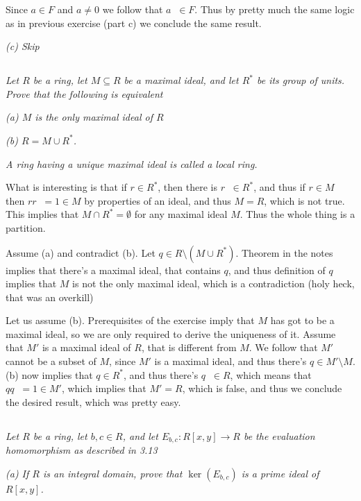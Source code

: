 \documentclass[11pt,oneside,titlepage]{book}
\DeclareMathOperator \inv {^{-1}}
\begin{document}
Since $a \in F$ and $a \neq 0$ we follow that $a \inv \in F$. Thus by
pretty much the same logic as in previous exercise (part c) we
conclude the same result.

\textit{(c) Skip}

\subsection{}

\textit{Let $R$ be a ring, let $M \subseteq R$ be a maximal ideal, and
let $R^*$ be its group of units. Prove that the following is
equivalent}

\textit{(a) $M$ is the only maximal ideal of $R$}

\textit{(b) $R = M \cup R^*$.}

\textit{A ring having a unique maximal ideal is called a local ring.}

What is interesting is that if $r \in R^*$, then there is $r\inv \in
R^*$, and thus if $r \in M$ then $r r\inv = 1 \in M$ by properties of
an ideal, and thus $M = R$, which is not true. This implies that $M
\cap R^* = \emptyset$ for any maximal ideal $M$. Thus the whole thing
is a partition.

Assume (a) and contradict (b). Let $q \in R \setminus (M \cup
R^*)$. Theorem in the notes implies that there's a maximal ideal, that
contains $q$, and thus definition of $q$ implies that $M$ is not the
only maximal ideal, which is a contradiction (holy heck, that was an
overkill)

Let us assume (b). Prerequisites of the exercise imply that $M$ has
got to be a maximal ideal, so we are only required to derive the
uniqueness of it. Assume that $M'$ is a maximal ideal of $R$, that is
different from $M$. We follow that $M'$ cannot be a subset of $M$,
since $M'$ is a maximal ideal, and thus there's $q \in M' \setminus
M$. (b) now implies that $q \in R^*$, and thus there's $q\inv \in R$,
which means that $q q\inv = 1 \in M'$, which implies that $M' = R$,
which is false, and thus we conclude the desired result, which was
pretty easy.

\subsection{}

\textit{Let $R$ be a ring, let $b, c \in R$, and let $E_{b, c}: R[x,
y] \to R$ be the evaluation homomorphism as described in 3.13 }

\textit{(a) If $R$ is an integral domain, prove that $\ker(E_{b,c})$
is a prime ideal of $R[x, y]$.}
\end{document}
